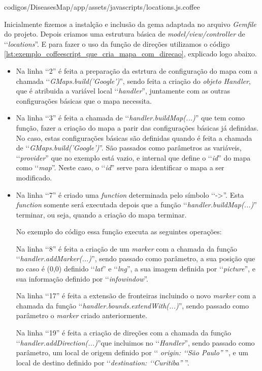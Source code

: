 
{codigos/DiseasesMap/app/assets/javascripts/locations.js.coffee}

Inicialmente fizemos a instalção e inclusão da gema adaptada no arquivo \emph{Gemfile} do projeto. Depois 
criamos uma estrutura básica de \emph{model/view/controller} de ‘‘\emph{locations}''. E para fazer o uso
da função de direções utilizamos o código \ref{lst:exemplo_coffeescript_que_cria_mapa_com_direcao},
explicado logo abaixo.

\begin{itemize}

 \item Na linha ‘‘2'' é feita a preparação da estrtura de configuração do mapa com a chamada 
 ‘‘\emph{GMaps.build('Google')}'', sendo feita a criação do \emph{objeto Handler}, que é atribuida a 
 variável local ‘‘\emph{handler}'', juntamente com as outras configurações básicas que o mapa necessita.
 
 \item Na linha ‘‘3'' é feita a chamada de ‘‘\emph{handler.buildMap(...)}'' que tem como função, fazer a 
 criação do mapa a parir das configurações básicas já definidas. No caso, estas configurações básicas
 são definidas quando é feita a chamada de ‘‘\emph{GMaps.build('Google')}''. São passados como parâmetros
 as variáveis, ‘‘\emph{provider}'' que no exemplo está vazio, e internal que define o ‘‘\emph{id}'' do
 mapa como ‘‘\emph{map}''. Neste caso, o ‘‘\emph{id}'' serve para identificar o mapa a ser modificado.
 
 \item Na linha ‘‘7'' é criado uma \emph{function} determinada pelo símbolo ‘‘->''. Esta \emph{function}
 somente será executada depois que a função ‘‘\emph{handler.buildMap(...)}'' terminar, ou seja, quando a
 criação do mapa terminar.
 
 No exemplo do código essa função executa as seguintes operações:
 
  \subitem Na linha ‘‘8'' é feita a criação de um \emph{marker} com a chamada da função 
  ‘‘\emph{handler.addMarker(...)}'', sendo passado como parâmetro, a sua posição que no caso é (0,0) 
  definido ‘‘\emph{lat}'' e ‘‘\emph{lng}'', a sua imagem definida por ‘‘\emph{picture}'', e sua informação 
  definido por ‘‘\emph{infowindow}''.
 
  \subitem Na linha ‘‘17'' é feita a extensão de fronteiras incluindo o novo \emph{marker} com a chamada 
  da função ‘‘\emph{handler.bounds.extendWith(...)}'', sendo passado como parâmetro o \emph{marker} criado
  anteriormente.
 
  \subitem Na linha ‘‘19'' é feita a criação de direções com a chamada da função 
  ‘‘\emph{handler.addDirection(...)}''que incluimos no ‘‘\emph{Handler}'', sendo passado como parâmetro, um 
  local de origem definido por ‘‘\emph{ origin: ‘‘São Paulo''} '', e um local de destino definido por 
  ‘‘\emph{destination: ‘‘Curitiba''} ''.
 
\end{itemize}

